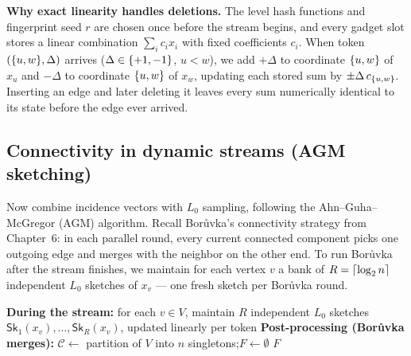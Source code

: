 \begin{whybox}
\textbf{Why exact linearity handles deletions.} The level hash functions and
fingerprint seed $r$ are chosen once before the stream begins, and every gadget
slot stores a linear combination $\sum_i c_i x_i$ with fixed coefficients $c_i$.
When token $(\{u,w\},\Delta)$ arrives ($\Delta\in\{+1,-1\}$, $u<w$), we add
$+\Delta$ to coordinate $\{u,w\}$ of $x_u$ and $-\Delta$ to coordinate
$\{u,w\}$ of $x_w$, updating each stored sum by $\pm \Delta\, c_{\{u,w\}}$.
Inserting an edge and later deleting it leaves every sum numerically identical
to its state before the edge ever arrived.
\end{whybox}

\subsection{Connectivity in dynamic streams (AGM sketching)}

Now combine incidence vectors with $L_0$ sampling, following the
Ahn--Guha--McGregor (AGM) algorithm. Recall Bor\r{u}vka's connectivity strategy
from Chapter~6: in each parallel round, every current connected component picks
one outgoing edge and merges with the neighbor on the other end. To run
Bor\r{u}vka after the stream finishes, we maintain for each vertex $v$ a bank of
$R = \lceil\log_2 n\rceil$ independent $L_0$ sketches of $x_v$ --- one fresh sketch
per Bor\r{u}vka round.

\begin{algorithm}[H]
\caption{\textsc{SketchConnectivity} (Ahn--Guha--McGregor)}
\label{ch40:alg-agm}
\DontPrintSemicolon
{}
\textbf{During the stream:} for each $v\in V$, maintain $R$ independent $L_0$ sketches
$\mathsf{Sk}_1(x_v),\dots,\mathsf{Sk}_R(x_v)$, updated linearly per token\;
\textbf{Post-processing (Bor\r{u}vka merges):}\;
$\mathcal{C}\gets$ partition of $V$ into $n$ singletons;\quad $F\gets\emptyset$\;
\Return $F$\;
\end{algorithm}

